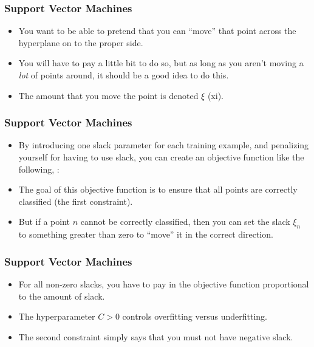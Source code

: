 \documentclass[trans,aspectratio=169]{beamer}
\begin{document}
\begin{frame}
  \frametitle{Support Vector Machines}
\begin{itemize}
\item   You want to be able to pretend that you
can ``move'' that point across the hyperplane on to the proper side.
\item 
You will have to pay a little bit to do so, but as long as you aren't
moving a \emph{lot} of points around, it should be a good idea to do
this.  
\item The amount that you move the point is denoted
$\xi$ (xi).
\end{itemize}
\end{frame}
\begin{frame}
  \frametitle{Support Vector Machines}
\begin{itemize}
\item 
By introducing one slack parameter for each training example, and
penalizing yourself for having to use slack, you can create an
objective function like the following, :
%
%
\item The goal of this objective function is to ensure that all points are
correctly classified (the first constraint).
\item  But if a point $n$
cannot be correctly classified, then you can set the slack $\xi_n$ to
something greater than zero to ``move'' it in the correct direction.
\end{itemize}
\end{frame}
\begin{frame}
  \frametitle{Support Vector Machines}
\begin{itemize}
\item 
For all non-zero slacks, you have to pay in the objective
function proportional to the amount of slack. 
\item  The hyperparameter
$C>0$ controls overfitting versus underfitting.  
\item The second constraint
simply says that you must not have negative slack.
\end{itemize}
\end{frame}
\end{document}
